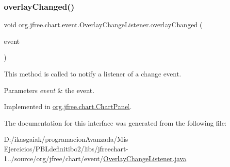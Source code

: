 \subsubsection{\texorpdfstring{overlay\+Changed()}{overlayChanged()}}
{\footnotesize\ttfamily void org.\+jfree.\+chart.\+event.\+Overlay\+Change\+Listener.\+overlay\+Changed (\begin{DoxyParamCaption}\item[{\mbox{\hyperlink{classorg_1_1jfree_1_1chart_1_1event_1_1_overlay_change_event}{Overlay\+Change\+Event}}}]{event }\end{DoxyParamCaption})}

This method is called to notify a listener of a change event.


\begin{DoxyParams}{Parameters}
{\em event} & the event. \\
\hline
\end{DoxyParams}


Implemented in \mbox{\hyperlink{classorg_1_1jfree_1_1chart_1_1_chart_panel_a62bd903d184caa407418637fd8fdfc66}{org.\+jfree.\+chart.\+Chart\+Panel}}.



The documentation for this interface was generated from the following file\+:\begin{DoxyCompactItemize}
\item 
D\+:/ikasgaiak/programacion\+Avanzada/\+Mis Ejercicios/\+P\+B\+Ldefinitibo2/libs/jfreechart-\/1../source/org/jfree/chart/event/\mbox{\hyperlink{_overlay_change_listener_8java}{Overlay\+Change\+Listener.\+java}}\end{DoxyCompactItemize}
